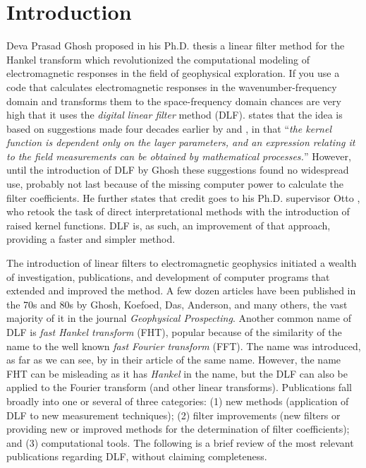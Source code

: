 \documentclass[paper,twocolumn,twoside]{geophysics}
\begin{document}
\section{Introduction}

Deva Prasad Ghosh proposed in his Ph.D. thesis \citep{PhD.70.Ghosh} a linear
filter method for the Hankel transform which revolutionized the computational
modeling of electromagnetic responses in the field of geophysical exploration.
If you use a code that calculates electromagnetic responses in the
wavenumber-frequency domain and transforms them to the space-frequency domain
chances are very high that it uses the \emph{digital linear filter} method
(DLF). \cite{GP.71.Ghosh} states that the idea is based on suggestions made
four decades earlier by \cite{PHY.33.Slichter} and \cite{GEO.40.Pekeris}, in
that ``\emph{the kernel function is dependent only on the layer parameters, and
  an expression relating it to the field measurements can be obtained by
mathematical processes.}'' However, until the introduction of DLF by Ghosh
these suggestions found no widespread use, probably not last because of the
missing computer power to calculate the filter coefficients. He further states
that credit goes to his Ph.D. supervisor Otto \cite{BK.68.Koefoed,
GP.70.Koefoed}, who retook the task of direct interpretational methods with the
introduction of raised kernel functions. DLF is, as such, an improvement of
that approach, providing a faster and simpler method.


The introduction of linear filters to electromagnetic geophysics initiated a
wealth of investigation, publications, and development of computer programs
that extended and improved the method. A few dozen articles have been published
in the 70s and 80s by Ghosh, Koefoed, Das, Anderson, and many others, the vast
majority of it in the journal \emph{Geophysical Prospecting}.
Another common name of DLF is \emph{fast Hankel transform} (FHT), popular
because of the similarity of the name to the well known \emph{fast Fourier
transform} (FFT). The name was introduced, as far as we can see, by
\cite{GP.79.Johansen} in their article of the same name. However, the name FHT
can be misleading as it has \emph{Hankel} in the name, but the DLF can also be
applied to the Fourier transform (and other linear transforms).
Publications fall broadly into one or several of three categories: (1) new
methods (application of DLF to new measurement techniques); (2) filter
improvements (new filters or providing new or improved methods for the
determination of filter coefficients); and (3) computational tools. The
following is a brief review of the most relevant publications regarding DLF,
without claiming completeness.
\end{document}
